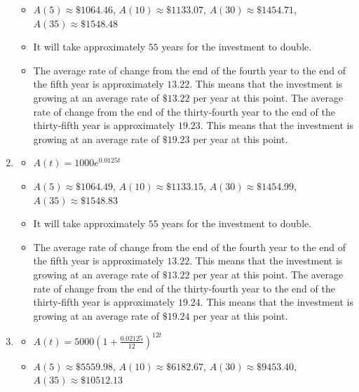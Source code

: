 \documentclass{ximera}
\begin{document}
\begin{enumerate}
\begin{itemize}
\item $A(5) \approx \$ 1064.46$, $A(10) \approx \$ 1133.07$, $A(30) \approx \$ 1454.71$, $A(35) \approx \$ 1548.48$ 

\item  It will take approximately $55$ years for the investment to double.

\item  The average rate of change from the end of the fourth year to the end of the fifth year is approximately $13.22$.  This means that the investment is growing at an average rate of $\$13.22$ per year at this point.  The average rate of change from the end of the thirty-fourth year to the end of the thirty-fifth year is approximately $19.23$.  This means that the investment is growing at an average rate of $\$19.23$ per year at this point. 

\end{itemize}



\item \begin{itemize}  \item $A(t) = 1000e^{0.0125t}$ 

\item $A(5) \approx \$ 1064.49$, $A(10) \approx \$ 1133.15$, $A(30) \approx \$ 1454.99$, $A(35) \approx \$ 1548.83$ 

\item It will take approximately $55$ years for the investment to double.

\item  The average rate of change from the end of the fourth year to the end of the fifth year is approximately $13.22$.  This means that the investment is growing at an average rate of $\$13.22$ per year at this point.  The average rate of change from the end of the thirty-fourth year to the end of the thirty-fifth year is approximately $19.24$.  This means that the investment is growing at an average rate of $\$19.24$ per year at this point. 

\end{itemize}

\pagebreak

\item \begin{itemize}  \item $A(t) = 5000\left(1 + \frac{0.02125}{12}\right)^{12t}$ 

\item $A(5) \approx \$ 5559.98$, $A(10) \approx \$ 6182.67$, $A(30) \approx \$ 9453.40$, $A(35) \approx \$ 10512.13$ 


\end{itemize}
\end{enumerate}
\end{document}
